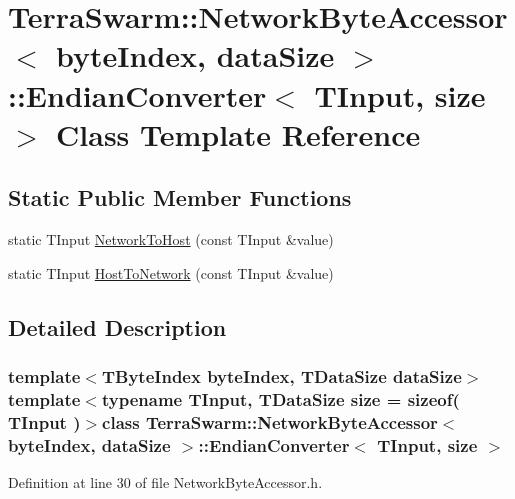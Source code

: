\hypertarget{class_terra_swarm_1_1_network_byte_accessor_1_1_endian_converter}{\section{Terra\-Swarm\-:\-:Network\-Byte\-Accessor$<$ byte\-Index, data\-Size $>$\-:\-:Endian\-Converter$<$ T\-Input, size $>$ Class Template Reference}
\label{class_terra_swarm_1_1_network_byte_accessor_1_1_endian_converter}
}
\subsection*{Static Public Member Functions}
\begin{DoxyCompactItemize}
\item 
static T\-Input \hyperlink{class_terra_swarm_1_1_network_byte_accessor_1_1_endian_converter_aa33fe4997f3ec0957f43d003b925f224}{Network\-To\-Host} (const T\-Input \&value)
\item 
static T\-Input \hyperlink{class_terra_swarm_1_1_network_byte_accessor_1_1_endian_converter_ab43849574a96cddb8f398d93afaf8f91}{Host\-To\-Network} (const T\-Input \&value)
\end{DoxyCompactItemize}


\subsection{Detailed Description}
\subsubsection*{template$<$T\-Byte\-Index byte\-Index, T\-Data\-Size data\-Size$>$template$<$typename T\-Input, T\-Data\-Size size = sizeof( T\-Input )$>$class Terra\-Swarm\-::\-Network\-Byte\-Accessor$<$ byte\-Index, data\-Size $>$\-::\-Endian\-Converter$<$ T\-Input, size $>$}



Definition at line 30 of file Network\-Byte\-Accessor.\-h.



